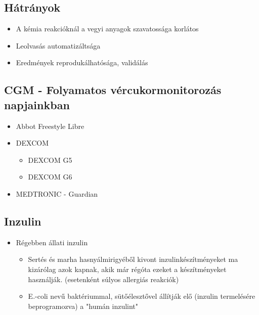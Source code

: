 \subsection{Hátrányok}
\begin{itemize}
    \item A kémia reakcióknál a vegyi anyagok szavatossága korlátos
    \item Leolvasás automatizáltsága
    \item Eredmények reprodukálhatósága, validálás
\end{itemize}

\subsection{CGM - Folyamatos vércukormonitorozás napjainkban}
\begin{itemize}
    \item Abbot Freestyle Libre
    \item DEXCOM
    \begin{itemize}
        \item DEXCOM G5
        \item DEXCOM G6
    \end{itemize}
    \item MEDTRONIC - Guardian
\end{itemize}

\subsection{Inzulin}
\begin{itemize}
    \item Régebben állati inzulin
    \begin{itemize}
        \item Sertés és marha hasnyálmirigyéből kivont
        inzulinkészítményeket ma kizárólag azok
        kapnak, akik már régóta ezeket a
        készítményeket használják. (esetenként súlyos
        allergiás reakciók)
        \item E.-coli nevű baktériummal, sütőélesztővel
        állítják elő (inzulin termelésére
        beprogramozva) a "humán inzulint"
    \end{itemize}
\end{itemize}

